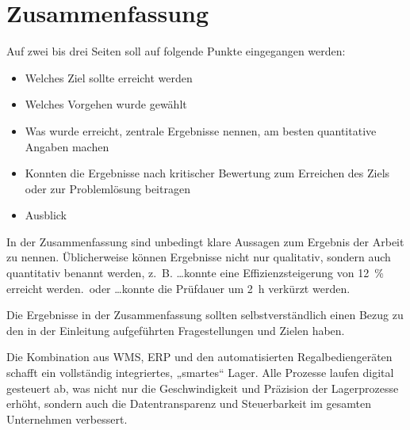 \chapter{Zusammenfassung}
\label{cha:zusammenfassung}

{\tiny Auf zwei bis drei Seiten soll auf folgende Punkte eingegangen werden:

\begin{itemize}
	\item Welches Ziel sollte erreicht werden
	\item Welches Vorgehen wurde gewählt
	\item Was wurde erreicht, zentrale Ergebnisse nennen, am besten quantitative Angaben machen
	\item Konnten die Ergebnisse nach kritischer Bewertung zum Erreichen des Ziels oder zur Problemlösung beitragen
	\item  Ausblick
\end{itemize}

In der Zusammenfassung sind unbedingt klare Aussagen zum Ergebnis der Arbeit zu nennen. Üblicherweise können Ergebnisse nicht nur qualitativ, sondern auch quantitativ benannt werden, z.~B. \glqq \ldots konnte eine Effizienzsteigerung von \SI{12}{\percent} erreicht werden.\grqq~oder \glqq \ldots konnte die Prüfdauer um \SI{2}{\hour} verkürzt werden\grqq.

Die Ergebnisse in der Zusammenfassung sollten selbstverständlich einen Bezug zu den in der Einleitung aufgeführten Fragestellungen und Zielen haben.}


Die Kombination aus WMS, ERP und den automatisierten Regalbediengeräten schafft ein vollständig integriertes, „smartes“ Lager. Alle Prozesse laufen digital gesteuert ab, was nicht nur die Geschwindigkeit und Präzision der Lagerprozesse erhöht, sondern auch die Datentransparenz und Steuerbarkeit im gesamten Unternehmen verbessert.